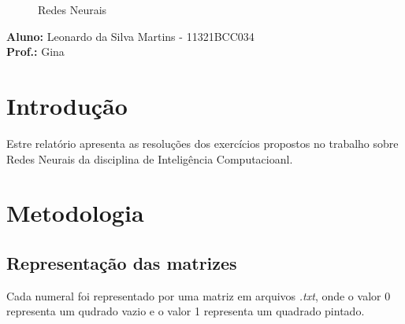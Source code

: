 \documentclass[hidelinks,12pt]{article}
\newcommand{\bigicon}[1]{\texttt{[image: \#1]}}
\begin{document}
\pagestyle{fancy}


\lhead{\bigicon{Figures/ufu}}
\rhead{\bigicon{Figures/facom}}
\lfoot{}
\cfoot{}
\rfoot{}
\vspace*{10cm}
\begin{figure}[!h]
	\centering
	\Huge{Redes Neurais}
\end{figure}

\vspace{5cm}
\noindent\textbf{Aluno:} Leonardo da Silva Martins - 11321BCC034\\
\textbf{Prof.:} Gina


\newpage
\fancyhead[C]{}
\fancyhead[R]{}
\fancyhead[L]{\leftmark}
\fancyfoot{}
\fancyfoot[C]{\hspace{1.5cm}\thepage}


\tableofcontents

{\let\thefootnote\relax{}}

\newpage

\section{Introdução}

    Estre relatório apresenta as resoluções dos exercícios propostos no trabalho sobre Redes Neurais da disciplina de Inteligência Computacioanl.

\section{Metodologia}
	
	
	\subsection{Representação das matrizes}
	
		Cada numeral foi representado por uma matriz em arquivos \emph{.txt}, onde o valor 0 representa um qudrado vazio e o valor 1 representa um quadrado pintado.
\end{document}
